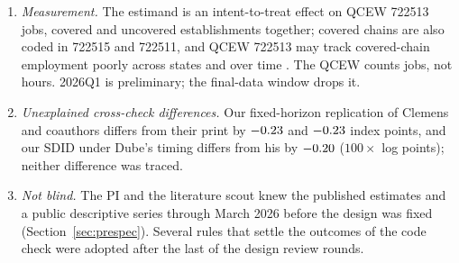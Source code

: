\begin{enumerate}
        implies, the tests over-reject; in the Monte Carlo design with California twice as noisy as
        its donors, the selected candidate's two-sided test at $t_J$ rejected in a share
        $\McDDTPOPWERFiftyHeteroACATwoRhoZeroZeroMaxTJTwo$ of replications. The power quantities rest
        on 2014--2019 noise; the post-period recomputations are reported next to them.
  \item \emph{Measurement.} The estimand is an intent-to-treat effect on QCEW 722513 jobs, covered
        and uncovered establishments together; covered chains are also coded in 722515 and 722511,
        and QCEW 722513 may track covered-chain employment poorly across states and over time
        \citep{melo2026covered}. The QCEW counts jobs, not hours. 2026Q1 is preliminary; the
        final-data window drops it.
  \item \emph{Unexplained cross-check differences.} Our fixed-horizon replication of Clemens and
        coauthors differs from their print by $-0.23$ and $-0.23$ index points,
        and our SDID under Dube's timing differs from his by $-0.20$ ($100\times$ log
        points); neither difference was traced.
  \item \emph{Not blind.} The PI and the literature scout knew the published estimates and a public
        descriptive series through March 2026 before the design was fixed
        (Section~\ref{sec:prespec}). Several rules that settle the outcomes of the code check were
        adopted after the last of the \CrewRoundsDesign{} design review rounds.
\end{enumerate}

